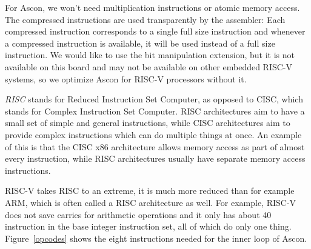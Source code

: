 For Ascon, we won't need multiplication instructions or atomic memory access.
The compressed instructions are used transparently by the assembler: Each
compressed instruction corresponds to a single full size instruction and
whenever a compressed instruction is available, it will be used instead of a
full size instruction. We would like to use the bit manipulation extension, but
it is not available on this board and may not be available on other embedded
RISC-V systems, so we optimize Ascon for RISC-V processors without it.

\emph{RISC} stands for Reduced Instruction Set Computer, as opposed to CISC,
which stands for Complex Instruction Set Computer. RISC architectures aim to
have a small set of simple and general instructions, while CISC architectures
aim to provide complex instructions which can do multiple things at once. An
example of this is that the CISC x86 architecture allows memory access as part
of almost every instruction, while RISC architectures usually have separate
memory access instructions.

RISC-V takes RISC to an extreme, it is much more reduced than for example ARM,
which is often called a RISC architecture as well. For example, RISC-V does not
save carries for arithmetic operations and it only has about 40 instruction in
the base integer instruction set, all of which do only one thing.
Figure~\ref{opcodes} shows the eight instructions needed for the inner loop of
Ascon.


